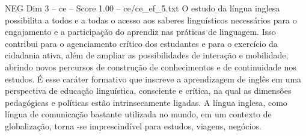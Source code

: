 \begin{textsample}{NEG Dim 3 – ce – Score 1.00 – ce/ce\_ef\_5.txt}
O estudo da língua inglesa possibilita a todos e a todas o acesso aos saberes linguísticos necessários para o engajamento e a participação do aprendiz nas práticas de linguagem.
Isso contribui para o agenciamento crítico dos estudantes e para o exercício da cidadania ativa, além de ampliar as possibilidades de interação e mobilidade, abrindo novos percursos de construção de conhecimentos e de continuidade nos estudos.
É esse caráter formativo que inscreve a aprendizagem de inglês em uma perspectiva de educação linguística, consciente e crítica, na qual as dimensões pedagógicas e políticas estão intrinsecamente ligadas.
A língua inglesa, como língua de comunicação bastante utilizada no mundo, em um contexto de globalização, torna -se imprescindível para estudos, viagens, negócios.

\end{textsample}
